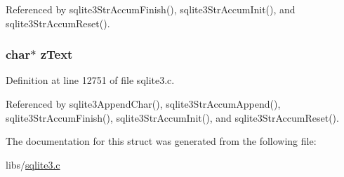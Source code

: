 Referenced by sqlite3\+Str\+Accum\+Finish(), sqlite3\+Str\+Accum\+Init(), and sqlite3\+Str\+Accum\+Reset().

\hypertarget{struct_str_accum_a5b0f04eca8815fab4b6b31b41282f992}{}
\subsubsection[{z\+Text}]{\setlength{\rightskip}{0pt plus 5cm}char$\ast$ z\+Text}\label{struct_str_accum_a5b0f04eca8815fab4b6b31b41282f992}


Definition at line 12751 of file sqlite3.\+c.



Referenced by sqlite3\+Append\+Char(), sqlite3\+Str\+Accum\+Append(), sqlite3\+Str\+Accum\+Finish(), sqlite3\+Str\+Accum\+Init(), and sqlite3\+Str\+Accum\+Reset().



The documentation for this struct was generated from the following file\+:\begin{DoxyCompactItemize}
\item 
libs/\hyperlink{sqlite3_8c}{sqlite3.\+c}\end{DoxyCompactItemize}
